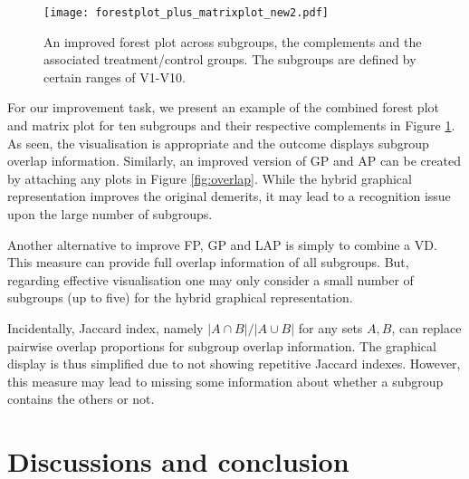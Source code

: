 \documentclass[Afour,sagev,times, doublespace]{sagej}
\begin{document}
{%

\begin{figure}
\begin{center}
		\texttt{[image: forestplot\_plus\_matrixplot\_new2.pdf]} \\
		\caption{An improved forest plot across subgroups, the complements and the associated treatment/control groups. The subgroups are defined by certain ranges of  V1-V10. }\label{fig:combination}
\end{center}
\end{figure}


 For our improvement task, we present an example of the combined forest plot and matrix plot for ten subgroups and their respective complements in Figure \ref{fig:combination}. As seen, the visualisation is appropriate and the outcome displays subgroup overlap information. Similarly, an improved version of GP and AP can be created by attaching any plots in Figure \ref{fig:overlap}. While the hybrid graphical representation improves the original demerits, it may lead to a recognition issue upon the large number of subgroups. %

 Another alternative to improve FP, GP and LAP is simply to combine a VD. This measure can provide full overlap information of all subgroups. But, regarding effective visualisation one may only consider a small number of subgroups (up to five) for the hybrid graphical representation.

 Incidentally, Jaccard index, namely $|A\cap B|/ |A\cup B|$ for any sets $A, B$, can replace pairwise overlap proportions for subgroup overlap information. The graphical display is thus simplified due to not showing repetitive Jaccard indexes. However, this measure may lead to missing some information about whether a subgroup contains the others or not.

\section{Discussions and conclusion}

}
\end{document}
